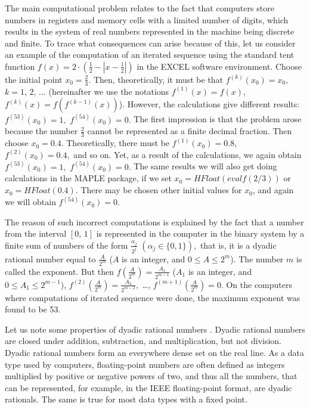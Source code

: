 \documentclass[12pt,a4paper]{amsart}
\begin{document}
The main computational problem relates to the fact that computers store numbers in registers and memory cells with a limited 
number of digits, which results in the system of real numbers represented in the machine being discrete and finite. To trace what 
consequences can arise because of this, let us consider an example of the computation of an iterated sequence using the standard 
tent function $f(x)=2\cdot\left(\frac12-|x-\frac12|\right)$ in the EXCEL software environment. Choose the initial point $x_0=\frac23.$
Then, theoretically, it must be that $f^{(k)}(x_0)=x_0,$ $k=1,\,2,\,\ldots$ (hereinafter we use the notations $f^{(1)}(x)=f(x),$ 
$f^{(k)}(x)=f\left(f^{(k-1)}(x)\right)$). However, the calculations give different results: $f^{(53)}(x_0)=1,$ $f^{(54)}(x_0)=0.$ 
The first impression is that the problem arose because the number $\frac23$ cannot be represented as a finite decimal fraction. Then 
choose $x_0=0.4.$ Theoretically, there must be $f^{(1)}(x_0)=0.8,$ $f^{(2)}(x_0)=0.4,$ and so on. Yet, as a result of the calculations, 
we again obtain $f^{(53)}(x_0)=1,$ $f^{(54)}(x_0)=0.$ The same results we will also get doing calculations in the MAPLE package, 
if we set $x_0=HFloat(evalf(2/3))$ or $x_0=HFloat(0.4).$ There may be chosen other initial values for $x_0$, and again we will obtain
$f^{(54)}(x_0)=0.$

The reason of such incorrect computations is explained by the fact that a number from the interval $[0,\,1]$ is represented 
in the computer in the binary system by a finite sum of numbers of the form $\frac{\alpha_j}{2^j}$ $\left(\alpha_j\in\{0,1\}\right),$
that is, it is a dyadic rational number equal to $\frac{A}{2^m}$ ($A$ is an integer, and $0\leq A \leq 2^m$). The number $m$ is called 
the exponent. But then $f\left(\frac{A}{2^m}\right)=\frac{A_1}{2^{m-1}}$ ($A_1$ is an integer, and $0\leq A_1 \leq 2^{m-1}$), 
$f^{(2)}\left(\frac{A}{2^m}\right)=\frac{A_2}{2^{m-2}},$ \ldots, $f^{(m+1)}\left(\frac{A}{2^m}\right)=0.$ On the computers 
where computations of iterated sequence were done, the maximum exponent was found to be 53.  

Let us note some properties of dyadic rational numbers \cite{Curtis}. Dyadic rational numbers are closed under addition, subtraction, 
and multiplication, but not division. Dyadic rational numbers form an everywhere dense set on the real line. As a data type used by 
computers, floating-point numbers are often defined as integers multiplied by positive or negative powers of two, and thus all the 
numbers, that can be represented, for example, in the IEEE floating-point format, are dyadic rationals. The same is true for most data 
types with a fixed point.
\end{document}
